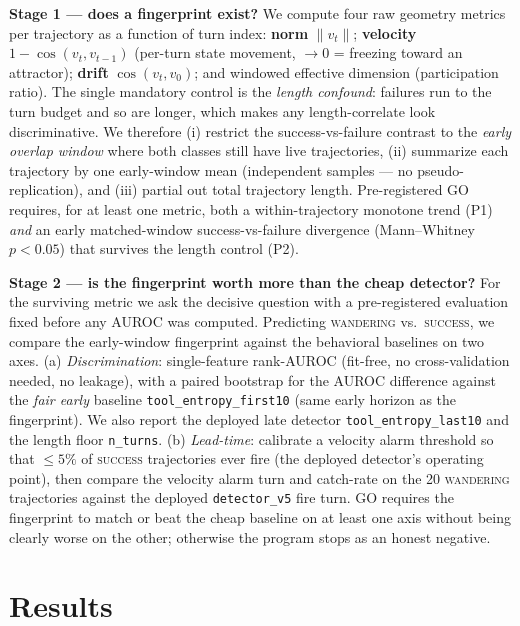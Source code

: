 \documentclass[11pt]{article}
\begin{document}
\textbf{Stage 1 --- does a fingerprint exist?} We compute four raw geometry metrics per trajectory as a function of turn index: \textbf{norm} $\lVert v_t\rVert$; \textbf{velocity} $1-\cos(v_t,v_{t-1})$ (per-turn state movement, $\to 0$ = freezing toward an attractor); \textbf{drift} $\cos(v_t,v_0)$; and windowed effective dimension (participation ratio). The single mandatory control is the \emph{length confound}: failures run to the turn budget and so are longer, which makes any length-correlate look discriminative. We therefore (i) restrict the success-vs-failure contrast to the \emph{early overlap window} where both classes still have live trajectories, (ii) summarize each trajectory by one early-window mean (independent samples --- no pseudo-replication), and (iii) partial out total trajectory length. Pre-registered GO requires, for at least one metric, both a within-trajectory monotone trend (P1) \emph{and} an early matched-window success-vs-failure divergence (Mann--Whitney $p<0.05$) that survives the length control (P2).

\textbf{Stage 2 --- is the fingerprint worth more than the cheap detector?} For the surviving metric we ask the decisive question with a pre-registered evaluation fixed before any AUROC was computed. Predicting \textsc{wandering} vs.\ \textsc{success}, we compare the early-window fingerprint against the behavioral baselines on two axes. (a) \emph{Discrimination}: single-feature rank-AUROC (fit-free, no cross-validation needed, no leakage), with a paired bootstrap for the AUROC difference against the \emph{fair early} baseline \texttt{tool\_entropy\_first10} (same early horizon as the fingerprint). We also report the deployed late detector \texttt{tool\_entropy\_last10} and the length floor \texttt{n\_turns}. (b) \emph{Lead-time}: calibrate a velocity alarm threshold so that $\le 5\%$ of \textsc{success} trajectories ever fire (the deployed detector's operating point), then compare the velocity alarm turn and catch-rate on the 20 \textsc{wandering} trajectories against the deployed \texttt{detector\_v5} fire turn. GO requires the fingerprint to match or beat the cheap baseline on at least one axis without being clearly worse on the other; otherwise the program stops as an honest negative.

\section{Results}\label{sec:results}
\end{document}
